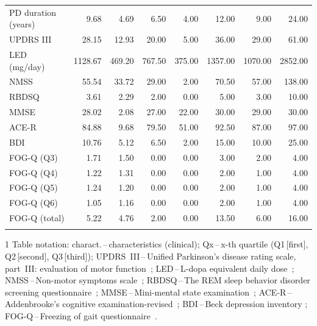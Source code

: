 \begin{table}[htb!]
\begin{threeparttable}
\begin{tabular}{l r r r r r r r}
			PD duration (years) &    9.68 &    4.69 &    6.50 &    4.00 &   12.00 &    9.00 &   24.00 \\
			UPDRS III           &   28.15 &   12.93 &   20.00 &    5.00 &   36.00 &   29.00 &   61.00 \\
			LED (mg/day)        & 1128.67 &  469.20 &  767.50 &  375.00 & 1357.00 & 1070.00 & 2852.00 \\
			NMSS                &   55.54 &   33.72 &   29.00 &    2.00 &   70.50 &   57.00 &  138.00 \\
			RBDSQ               &    3.61 &    2.29 &    2.00 &    0.00 &    5.00 &    3.00 &   10.00 \\
			MMSE                &   28.02 &    2.08 &   27.00 &   22.00 &   30.00 &   29.00 &   30.00 \\
			ACE-R               &   84.88 &    9.68 &   79.50 &   51.00 &   92.50 &   87.00 &   97.00 \\
			BDI                 &   10.76 &    5.12 &    6.50 &    2.00 &   15.00 &   10.00 &   25.00 \\
			FOG-Q (Q3)          &    1.71 &    1.50 &    0.00 &    0.00 &    3.00 &    2.00 &    4.00 \\
			FOG-Q (Q4)          &    1.22 &    1.31 &    0.00 &    0.00 &    2.00 &    1.00 &    4.00 \\
			FOG-Q (Q5)          &    1.24 &    1.20 &    0.00 &    0.00 &    2.00 &    1.00 &    4.00 \\
			FOG-Q (Q6)          &    1.05 &    1.16 &    0.00 &    0.00 &    2.00 &    1.00 &    4.00 \\
			FOG-Q (total)       &    5.22 &    4.76 &    2.00 &    0.00 &   13.50 &    6.00 &   16.00 \\

			\noalign{\smallskip}\hline\hline
		\end{tabular}

		\begin{tablenotes}
			\scriptsize
			\item[1] Table notation: charact.\,--\,characteristics (clinical); Qx\,--\,x-th quartile (Q1\,[first], Q2\,[second], Q3\,[third]); UPDRS~III\,--\,Unified Parkinson's disease rating scale, part~III: evaluation of motor function~\cite{Fahn1987}; LED\,--\,L-dopa equivalent daily dose~\cite{Lee2010}; NMSS\,--\,Non-motor symptoms scale~\cite{Chaudhuri2007}; RBDSQ\,--\,The REM sleep behavior disorder screening questionnaire~\cite{Stiasny2007}; MMSE\,--\,Mini-mental state examination~\cite{Folstein1975}; ACE-R\,--\,Addenbrooke's cognitive examination-revised~\cite{Larner2007}; BDI\,--\,Beck depression inventory \cite{Beck2000, Beck1961}; FOG-Q\,--\,Freezing of gait questionnaire~\cite{Giladi2000}.
		\end{tablenotes}
	\end{threeparttable}
\end{table}

